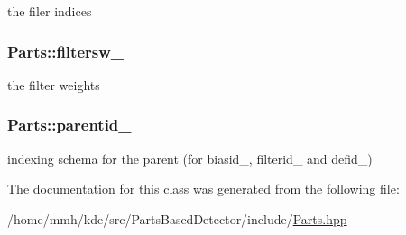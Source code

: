 the filer indices 

\hypertarget{classParts_a1de4d2cb595176d37aae609acbce88d8}{
\subsubsection[{filtersw\-\_\-}]{ Parts\-::filtersw\-\_\-\hspace{0.3cm}{\ttfamily [private]}}}\label{classParts_a1de4d2cb595176d37aae609acbce88d8}


the filter weights 

\hypertarget{classParts_ad74222c286ee6ee93659109a6d1d625f}{
\subsubsection[{parentid\-\_\-}]{ Parts\-::parentid\-\_\-\hspace{0.3cm}{\ttfamily [private]}}}\label{classParts_ad74222c286ee6ee93659109a6d1d625f}


indexing schema for the parent (for biasid\-\_\-, filterid\-\_\- and defid\-\_\-) 



The documentation for this class was generated from the following file\-:\begin{DoxyCompactItemize}
\item 
/home/mmh/kde/src/\-Parts\-Based\-Detector/include/\hyperlink{Parts_8hpp}{Parts.\-hpp}\end{DoxyCompactItemize}
